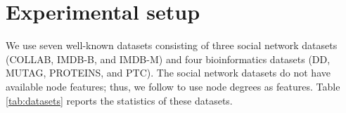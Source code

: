 \documentclass[twoside,leqno,twocolumn]{article}
\newcommand{\citep}{\cite}
\begin{document}
\section{Experimental setup}



We use seven well-known datasets consisting of three social network datasets (COLLAB, IMDB-B, and IMDB-M)
and four bioinformatics datasets (DD, MUTAG, PROTEINS, and PTC).
The social network datasets do not have available node features; thus, we follow \citep{niepert2016learning,zhang2018end} to use node degrees as features.
Table \ref{tab:datasets} reports the statistics of these datasets.

\begin{table}[!ht]
\caption{Statistics of the experimental benchmark datasets. 
\textbf{\#G} denotes the numbers of graphs. \textbf{\#Cls} denotes the number of class labels. 
\textbf{Avg\#N} denotes the average number of nodes per graph. \textbf{Avg\#E} denotes the average number of neighbors per node. \textbf{$d$} is the dimension of feature vectors. Note that \textbf{$d$} is also equal to the node embedding size at each U2GNN layer.}
\centering
{}
\label{tab:datasets}
\end{table}
\end{document}
